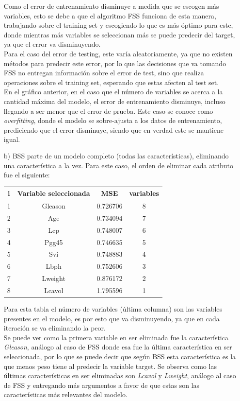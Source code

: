 \documentclass[10pt]{article}
\begin{document}
\begin{itemize}
Como el error de entrenamiento disminuye a medida que se escogen más variables, esto se debe a que el algoritmo FSS funciona de esta manera, trabajando sobre el training set y escogiendo lo que es más óptimo para este, donde mientras más variables se seleccionan más se puede predecir del target, ya que el error va disminuyendo. \\

Para el caso del error de testing, este varía aleatoriamente, ya que no existen métodos para predecir este error, por lo que las decisiones que va tomando FSS no entregan información sobre el error de test, sino que realiza operaciones sobre el training set, esperando que estas afecten al test set.\\
En el gráfico anterior, en el caso que el número de variables se acerca a la cantidad máxima del modelo, el error de entrenamiento disminuye, incluso llegando a ser menor que el error de prueba. Este caso se conoce como \textit{overfitting}, donde el modelo se sobre-ajusta a los datos de entrenamiento, prediciendo que el error disminuye, siendo que en verdad este se mantiene igual.

\item[b)] BSS parte de un modelo completo (todas las características), eliminando una característica a la vez. Para este caso, el orden de eliminar cada atributo fue el siguiente:

\begin{table}[!htb]
 \begin{center}
   \begin{tabular}{|c|c|c|c|} \hline
   i & Variable seleccionada & MSE & variables \\ \hline
   1 & Gleason & 0.726706 &8 \\
   2 & Age & 0.734094 &7 \\
   3 & Lcp & 0.748007 &6 \\
   4 & Pgg45 & 0.746635 &5 \\
   5 & Svi & 0.748883 &4 \\
   6 & Lbph & 0.752606 &3 \\
   7 & Lweight & 0.876172 &2 \\
   8 & Lcavol & 1.795596 &1 \\ \hline 
   \end{tabular}
 \end{center}
\end{table}
Para esta tabla el número de variables (última columna) son las variables presentes en el modelo, es por esto que va disminuyendo, ya que en cada iteración se va eliminando la peor.\\
Se puede ver como la primera variable en ser eliminada fue la característica \textit{Gleason}, análogo al caso de FSS donde esa fue la última característica en ser seleccionada, por lo que se puede decir que según BSS esta característica es la que menos peso tiene al predecir la variable target. Se observa como las últimas características en ser eliminadas son \textit{Lcavol} y \textit{Lweight}, análogo al caso de FSS y entregando más argumentos a favor de que estas son las características más relevantes del modelo.\\


\end{itemize}
\end{document}
